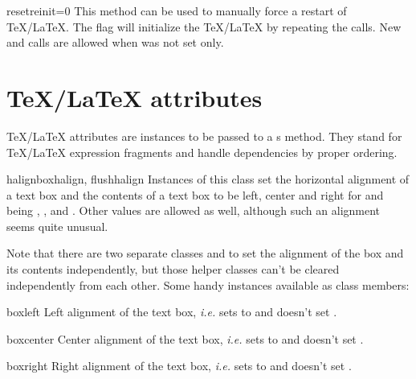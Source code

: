 \begin{methoddesc}{reset}{reinit=0}
  This method can be used to manually force a restart of
  \TeX/\LaTeX{}. The flag  will initialize the
  \TeX/\LaTeX{} by repeating the  calls. New
   and  calls are allowed when
   was not set only.
\end{methoddesc}


\section{\TeX/\LaTeX{} attributes}

\TeX/\LaTeX{} attributes are instances to be passed to a
s  method. They stand for
\TeX/\LaTeX{} expression fragments and handle dependencies by proper
ordering.

\begin{classdesc}{halign}{boxhalign, flushhalign}
  Instances of this class set the horizontal alignment of a text box
  and the contents of a text box to be left, center and right for
   and  being , ,
  and . Other values are allowed as well, although such an
  alignment seems quite unusual.
\end{classdesc}

Note that there are two separate classes  and
 to set the alignment of the box and its contents
independently, but those helper classes can't be cleared independently
from each other. Some handy instances available as class members:

\begin{memberdesc}{boxleft}
  Left alignment of the text box, \emph{i.e.} sets  to
   and doesn't set .
\end{memberdesc}

\begin{memberdesc}{boxcenter}
  Center alignment of the text box, \emph{i.e.} sets  to
   and doesn't set .
\end{memberdesc}

\begin{memberdesc}{boxright}
  Right alignment of the text box, \emph{i.e.} sets  to
   and doesn't set .
\end{memberdesc}


